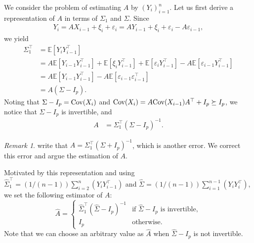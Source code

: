 \documentclass[11pt,a4paper]{article}
\theoremstyle{remark}
\newtheorem{remark}{Remark}
\theoremstyle{definition}
\newcommand{\bX}{X}
\newcommand{\bY}{Y}
\newcommand{\bepsilon}{\epsilon}
\newcommand{\bvarepsilon}{\varepsilon}
\newcommand{\bxi}{\xi}
\newcommand{\bfA}{A}
\newcommand{\bfI}{I}
\newcommand{\bSigma}{\Sigma}
\newcommand{\E}{\mathbb{E}}
\newcommand{\Cov}{\textnormal{Cov}}
\renewcommand{\epsilon}{\varepsilon}
\theoremstyle{definition}
\renewcommand{\hat}{\widehat}
\begin{document}
\begin{bibunit}[apalike]
We consider the problem of estimating $\bfA$ by $(\bY_{i})_{i=1}^{n}$.
Let us first derive a representation of $\bfA$ in terms of $\bSigma_{1}$ and $\bSigma$.
Since
\begin{align*}
    \bY_{i}=\bfA\bX_{i-1}+\bxi_{i}+\bvarepsilon_{i}=\bfA\bY_{i-1}+\bxi_{i}+\bvarepsilon_{i}-\bfA\bvarepsilon_{i-1},
\end{align*}
we yield
\begin{align*}
    \bSigma_{1}^{\top}&=\E\left[\bY_{i}\bY_{i-1}^{\top}\right]\\
    &=\bfA\E\left[\bY_{i-1}\bY_{i-1}^{\top}\right]+\E\left[\bxi_{i}\bY_{i-1}^{\top}\right]+\E\left[\bvarepsilon_{i}\bY_{i-1}^{\top}\right]-\bfA\E\left[\bvarepsilon_{i-1}\bY_{i-1}^{\top}\right]\\
    &=\bfA\E\left[\bY_{i-1}\bY_{i-1}^{\top}\right]-\bfA\E\left[\bvarepsilon_{i-1}\bepsilon_{i-1}^{\top}\right]\\
    &=\bfA\left(\bSigma-\bfI_{p}\right).
\end{align*}
Noting that $\bSigma-\bfI_{p}=\Cov(\bX_{i})$ and $\Cov(\bX_{i})=\bfA\Cov(\bX_{i-1})\bfA^{\top}+\bfI_{p}\succeq\bfI_{p}$, we notice that $\bSigma-\bfI_{p}$ is invertible, and 
\begin{align*}
    \bfA&=\bSigma_{1}^{\top}\left(\bSigma-\bfI_{p}\right)^{-1}.
\end{align*}
\begin{remark}
\citet{nakakita2024dimension} write that $\bfA=\bSigma_{1}^{\top}(\bSigma+\bfI_{p})^{-1}$, which is another error.
We correct this error and argue the estimation of $\bfA$.
\end{remark}

Motivated by this representation and using $\hat{\bSigma}_{1}^{\top}=(1/(n-1))\sum_{i=2}^{n}(\bY_{i}\bY_{i-1}^{\top})$ and $\hat{\bSigma}=(1/(n-1))\sum_{i=1}^{n-1}(\bY_{i}\bY_{i}^{\top})$, we set the following estimator of $\bfA$:
\begin{equation*}
    \hat{\bfA}=\begin{cases}
        \hat{\bSigma}_{1}^{\top}\left(\hat{\bSigma}-\bfI_{p}\right)^{-1} &\text{if }\hat{\bSigma}-\bfI_{p}\text{ is invertible},\\
        \bfI_{p}&\text{otherwise}.
    \end{cases}
\end{equation*}
Note that we can choose an arbitrary value as $\hat{\bfA}$ when $\hat{\bSigma}-\bfI_{p}$ is not invertible.


\end{bibunit}
\end{document}

